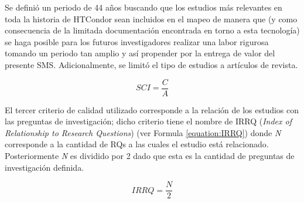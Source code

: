 Se definió un periodo de 44 años buscando que los estudios más relevantes en toda la historia de HTCondor sean incluidos en el mapeo de manera que (y como consecuencia de la limitada documentación encontrada en torno a esta tecnología) se haga posible para los futuros investigadores realizar una labor rigurosa tomando un periodo tan amplio y así propender por la entrega de valor del presente SMS. Adicionalmente, se limitó el tipo de estudios a artículos de revista.

\begin{equation}
	\label{equation:SCI}
	SCI = \frac{C}{A}
\end{equation}

El tercer criterio de calidad utilizado corresponde a la relación de los estudios con las preguntas de investigación; dicho criterio tiene el nombre de IRRQ (\textit{Index of Relationship to Research Questions}) (ver Formula \ref{equation:IRRQ}) donde \textit{N} corresponde a la cantidad de RQs a las cuales el estudio está relacionado. Posteriormente \textit{N} es dividido por 2 dado que esta es la cantidad de preguntas de investigación definida.

\begin{equation}
	\label{equation:IRRQ}
	IRRQ = \frac{N}{2}
\end{equation}
